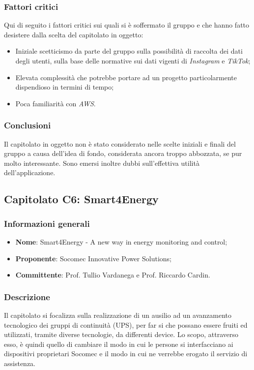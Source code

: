 \documentclass[11pt]{article}
\begin{document}
    \subsubsection{Fattori critici}
    Qui di seguito i fattori critici sui quali si è soffermato il gruppo e che hanno fatto desistere dalla scelta del capitolato in
    oggetto:
    \begin{itemize}
    	\item Iniziale scetticismo da parte del gruppo sulla possibilità di raccolta dei dati degli utenti, sulla base
    	delle normative sui dati vigenti di \textit{Instagram} e \textit{TikTok};
		\item Elevata complessità che potrebbe portare ad un progetto particolarmente dispendioso in termini di tempo;
		\item Poca familiarità con \textit{AWS}.
    \end{itemize}
        
    \subsubsection{Conclusioni}
    Il capitolato in oggetto non è stato considerato nelle scelte iniziali e finali del gruppo a causa dell'idea di fondo, considerata
    ancora troppo abbozzata, se pur molto interessante. Sono emersi inoltre dubbi sull'effettiva utilità dell'applicazione.

\newpage




\subsection{Capitolato C6: Smart4Energy}

    \subsubsection{Informazioni generali}
    \begin{itemize}
        \item \textbf{Nome}: Smart4Energy - A new way in energy monitoring and control;
        \item \textbf{Proponente}: Socomec Innovative Power Solutions;
        \item \textbf{Committente}: Prof. Tullio Vardanega e Prof. Riccardo Cardin.
    \end{itemize}
    
    \subsubsection{Descrizione}
    Il capitolato si focalizza sulla realizzazione di un ausilio ad un avanzamento tecnologico dei gruppi di continuità (UPS), per far si
    che possano essere fruiti ed utilizzati, tramite diverse tecnologie, da differenti device. Lo scopo, attraverso esso, è quindi quello
    di cambiare il modo in cui le persone si interfacciano ai dispositivi proprietari Socomec e il modo in cui ne verrebbe erogato il
    servizio di assistenza.
    
\end{document}
